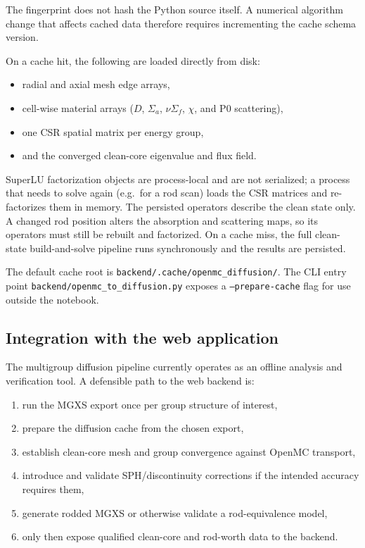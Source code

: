 \documentclass[11pt]{article}
\begin{document}
The fingerprint does not hash the Python source itself.  A numerical algorithm
change that affects cached data therefore requires incrementing the cache
schema version.

On a cache hit, the following are loaded directly from disk:
\begin{itemize}
  \item radial and axial mesh edge arrays,
  \item cell-wise material arrays ($D$, $\Sigma_a$, $\nu\Sigma_f$, $\chi$,
        and P0 scattering),
  \item one CSR spatial matrix per energy group,
  \item and the converged clean-core eigenvalue and flux field.
\end{itemize}

SuperLU factorization objects are process-local and are not serialized; a
process that needs to solve again (e.g.\ for a rod scan) loads the CSR
matrices and re-factorizes them in memory.  The persisted operators describe
the clean state only.  A changed rod position alters the absorption and
scattering maps, so its operators must still be rebuilt and factorized.  On a
cache miss, the full clean-state build-and-solve pipeline runs synchronously
and the results are persisted.

The default cache root is \texttt{backend/.cache/openmc\_diffusion/}.  The
CLI entry point \texttt{backend/openmc\_to\_diffusion.py} exposes a
\texttt{--prepare-cache} flag for use outside the notebook.

\subsection{Integration with the web application}

The multigroup diffusion pipeline currently operates as an offline
analysis and verification tool.  A defensible path to the web backend is:

\begin{enumerate}
  \item run the MGXS export once per group structure of interest,
  \item prepare the diffusion cache from the chosen export,
  \item establish clean-core mesh and group convergence against OpenMC
        transport,
  \item introduce and validate SPH/discontinuity corrections if the intended
        accuracy requires them,
  \item generate rodded MGXS or otherwise validate a rod-equivalence model,
  \item only then expose qualified clean-core and rod-worth data to the
        backend.
\end{enumerate}
\end{document}
